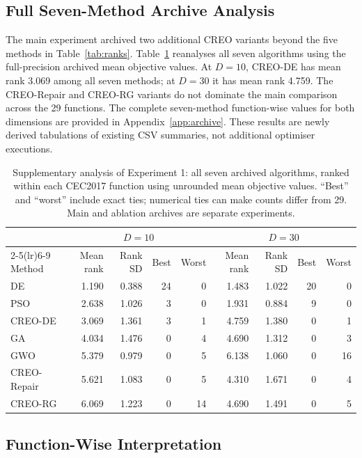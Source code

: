 \documentclass[a4paper,fleqn]{cas-sc}
\begin{document}
\subsection{Full Seven-Method Archive Analysis}

The main experiment archived two additional CREO variants beyond the five methods in Table~\ref{tab:ranks}. Table~\ref{tab:all7} reanalyses all seven algorithms using the full-precision archived mean objective values. At $D=10$, CREO-DE has mean rank 3.069 among all seven methods; at $D=30$ it has mean rank 4.759. The CREO-Repair and CREO-RG variants do not dominate the main comparison across the 29 functions. The complete seven-method function-wise values for both dimensions are provided in Appendix~\ref{app:archive}. These results are newly derived tabulations of existing CSV summaries, not additional optimiser executions.

\begin{table}[t]
\centering
\caption{Supplementary analysis of Experiment 1: all seven archived algorithms, ranked within each CEC2017 function using unrounded mean objective values. ``Best'' and ``worst'' include exact ties; numerical ties can make counts differ from 29. Main and ablation archives are separate experiments.}
\label{tab:all7}
\small
\begin{tabular}{lrrrr|rrrr}
\toprule
& \multicolumn{4}{c}{$D=10$} & \multicolumn{4}{c}{$D=30$}\\
\cmidrule(lr){2-5}\cmidrule(lr){6-9}
Method & Mean rank & Rank SD & Best & Worst & Mean rank & Rank SD & Best & Worst\\
\midrule
DE & 1.190 & 0.388 & 24 & 0 & 1.483 & 1.022 & 20 & 0\\
PSO & 2.638 & 1.026 & 3 & 0 & 1.931 & 0.884 & 9 & 0\\
CREO-DE & 3.069 & 1.361 & 3 & 1 & 4.759 & 1.380 & 0 & 1\\
GA & 4.034 & 1.476 & 0 & 4 & 4.690 & 1.312 & 0 & 3\\
GWO & 5.379 & 0.979 & 0 & 5 & 6.138 & 1.060 & 0 & 16\\
CREO-Repair & 5.621 & 1.083 & 0 & 5 & 4.310 & 1.671 & 0 & 4\\
CREO-RG & 6.069 & 1.223 & 0 & 14 & 4.690 & 1.491 & 0 & 5\\
\bottomrule
\end{tabular}
\end{table}

\subsection{Function-Wise Interpretation}
\end{document}

